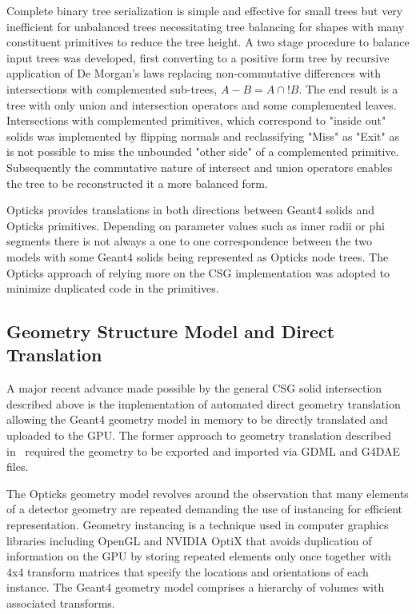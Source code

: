 \documentclass{webofc}
\begin{document}
Complete binary tree serialization is simple and effective for small trees but very inefficient 
for unbalanced trees necessitating tree balancing for shapes with many constituent primitives 
to reduce the tree height.  A two stage procedure to balance input trees was developed, 
first converting to a positive form tree by recursive application of De Morgan's laws replacing 
non-commutative differences with intersections with complemented sub-trees, $A - B  = A \cap !B $. 
The end result is a tree with only union and intersection operators and some complemented leaves. Intersections with 
complemented primitives, which correspond to "inside out" solids was implemented by flipping normals
and reclassifying "Miss" as "Exit" as is not possible to miss the unbounded "other side" of a 
complemented primitive.  Subsequently the commutative nature of intersect and union operators enables
the tree to be reconstructed it a more balanced form. 

Opticks provides translations in both directions between Geant4 solids and Opticks primitives.
Depending on parameter values such as inner radii or phi segments there is not always a one to one correspondence 
between the two models with some Geant4 solids being represented as Opticks node trees. The Opticks 
approach of relying more on the CSG implementation was adopted to minimize duplicated code in the primitives.
%
\subsection{Geometry Structure Model and Direct Translation}
%
A major recent advance made possible by the general CSG solid intersection 
described above is the implementation of automated direct geometry translation 
allowing the Geant4 geometry model in memory to be directly translated and uploaded to the GPU.
The former approach to geometry translation described in~\cite{chep2016} required the
geometry to be exported and imported via GDML and G4DAE files. 

The Opticks geometry model revolves around the observation that many elements of a detector 
geometry are repeated demanding the use of instancing for efficient representation.  Geometry instancing 
is a technique used in computer graphics libraries including OpenGL and NVIDIA OptiX that avoids 
duplication of information on the GPU by storing repeated elements only once together with 4x4 transform matrices 
that specify the locations and orientations of each instance.
The Geant4 geometry model comprises a hierarchy of volumes with associated transforms. 
\end{document}

